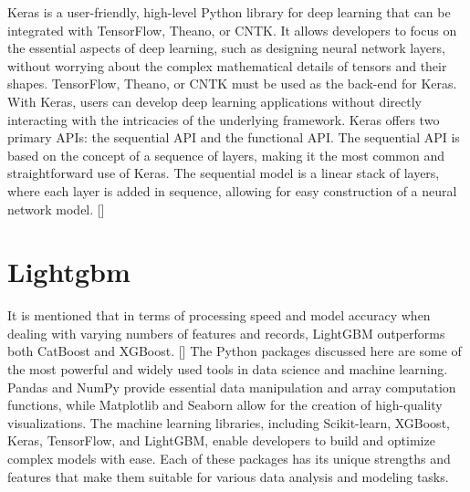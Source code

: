 Keras is a user-friendly, high-level Python library for deep learning that can be integrated with TensorFlow, Theano, or CNTK. It allows developers to focus on the essential aspects of deep learning, such as designing neural network layers, without worrying about the complex mathematical details of tensors and their shapes. TensorFlow, Theano, or CNTK must be used as the back-end for Keras. With Keras, users can develop deep learning applications without directly interacting with the intricacies of the underlying framework.
Keras offers two primary APIs: the sequential API and the functional API. The sequential API is based on the concept of a sequence of layers, making it the most common and straightforward use of Keras. The sequential model is a linear stack of layers, where each layer is added in sequence, allowing for easy construction of a neural network model. [\cite{Manaswi:2018}]

\section{Lightgbm}

It is mentioned that in terms of processing speed and model accuracy when dealing with varying numbers of features and records, LightGBM outperforms both CatBoost and XGBoost. [\cite{Al:2019}]
The Python packages discussed here are some of the most powerful and widely used tools in data science and machine learning. Pandas and NumPy provide essential data manipulation and array computation functions, while Matplotlib and Seaborn allow for the creation of high-quality visualizations. The machine learning libraries, including Scikit-learn, XGBoost, Keras, TensorFlow, and LightGBM, enable developers to build and optimize complex models with ease. Each of these packages has its unique strengths and features that make them suitable for various data analysis and modeling tasks. 



